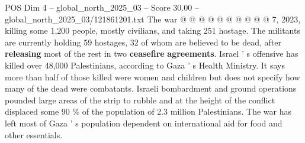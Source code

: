 \begin{textsample}{POS Dim 4 – global\_north\_2025\_03 – Score 30.00 – global\_north\_2025\_03/121861201.txt}
The war @ @ @ @ @ @ @ @ @ @ 7, 2023, killing some 1,200 people, mostly civilians, and taking 251 hostage.
The militants are currently holding 59 hostages, 32 of whom are believed to be dead, after \textbf{releasing} most of the rest in two \textbf{ceasefire} \textbf{agreements}.
Israel ' s offensive has killed over 48,000 Palestinians, according to Gaza ' s Health Ministry.
It says more than half of those killed were women and children but does not specify how many of the dead were combatants.
Israeli bombardment and ground operations pounded large areas of the strip to rubble and at the height of the conflict displaced some 90 \% of the population of 2.3 million Palestinians.
The war has left most of Gaza ' s population dependent on international aid for food and other essentials.

\end{textsample}
